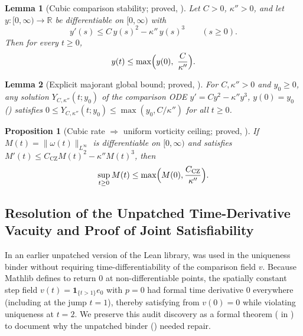 \documentclass[11pt,a4paper]{article}
\theoremstyle{plain}
\newtheorem{proposition}{Proposition}[section]
\newtheorem{lemma}{Lemma}[section]
\theoremstyle{definition}
\theoremstyle{remark}
\newcommand{\R}{\mathbb{R}}
\newcommand{\CZ}{C_{\mathrm{CZ}}}
\begin{document}
\begin{lemma}[Cubic comparison stability; proved, ]\label{lem:cubic}
Let $C>0$, $\kappa''>0$, and let $y:[0,\infty)\to\R$ be differentiable on $[0,\infty)$ with
\[
y'(s)\le C\,y(s)^2-\kappa''\,y(s)^3\qquad(s\ge0).
\]
Then for every $t\ge0$,
\[
y(t)\le\max\Bigl(y(0),\ \frac{C}{\kappa''}\Bigr).
\]
\end{lemma}

\begin{lemma}[Explicit majorant global bound; proved, ]\label{lem:majorant}
For $C,\kappa''>0$ and $y_0\ge0$, any solution $Y_{C,\kappa''}(t;y_0)$ of the comparison ODE $y'=Cy^2-\kappa''y^3$, $y(0)=y_0$ () satisfies $0\le Y_{C,\kappa''}(t;y_0)\le\max(y_0,C/\kappa'')$ for all $t\ge0$.
\end{lemma}

\begin{proposition}[Cubic rate $\Rightarrow$ uniform vorticity ceiling; proved, ]\label{prop:ceiling}
If $M(t)=\|\omega(t)\|_{L^\infty}$ is differentiable on $[0,\infty)$ and satisfies $M'(t)\le \CZ M(t)^2-\kappa''M(t)^3$, then
\[
\sup_{t\ge0}M(t)\le\max\Bigl(M(0),\frac{\CZ}{\kappa''}\Bigr).
\]
\end{proposition}

\subsection{Resolution of the Unpatched Time-Derivative Vacuity and Proof of Joint Satisfiability}\label{sec:vacuity}
In an earlier unpatched version of the Lean library,  was used in the uniqueness binder  without requiring time-differentiability of the comparison field $v$. Because Mathlib defines  to return $0$ at non-differentiable points, the spatially constant step field $v(t)=\mathbf 1_{\{t>1\}}e_0$ with $p=0$ had formal time derivative $0$ everywhere (including at the jump $t=1$), thereby satisfying  from $v(0)=0$ while violating uniqueness at $t=2$. We preserve this audit discovery as a formal theorem ( in ) to document why the unpatched binder () needed repair.
\end{document}
